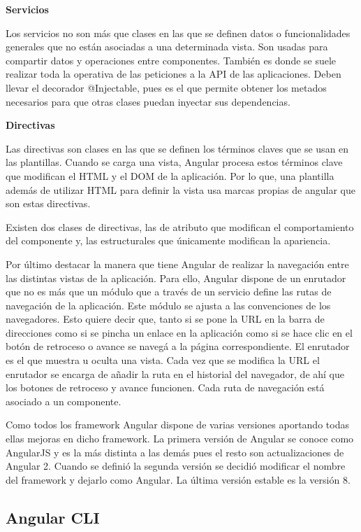 \documentclass[a4paper, 12pt]{book}
\begin{document}
\textbf{Servicios}

Los servicios no son más que clases en las que se definen datos o funcionalidades generales que no están asociadas a una determinada vista. Son usadas para compartir datos y operaciones entre componentes. También es donde se suele realizar toda la operativa de las peticiones a la API de las aplicaciones. Deben llevar el decorador @Injectable, pues es el que permite obtener los metados necesarios para que otras clases puedan inyectar sus dependencias. 

\textbf{Directivas}

Las directivas son clases en las que se definen los términos claves que se usan en las plantillas. Cuando se carga una vista, Angular procesa estos términos clave que modifican el HTML y el DOM de la aplicación. Por lo que, una plantilla además de utilizar HTML para definir la vista usa marcas propias de angular que son estas directivas. 

Existen dos clases de directivas, las de atributo que modifican el comportamiento del componente y, las estructurales que únicamente modifican la apariencia. 

Por último destacar la manera que tiene Angular de realizar la navegación entre las distintas vistas de la aplicación. Para ello, Angular dispone de un enrutador que no es más que un módulo que a través de un servicio define las rutas de navegación de la aplicación. Este módulo se ajusta a las convenciones de los navegadores. Esto quiere decir que, tanto si se pone la URL en la barra de direcciones como si se pincha un enlace en la aplicación como si se hace clic en el botón de retroceso o avance se navegá a la página correspondiente. El enrutador es el que muestra u oculta una vista. Cada vez que se modifica la URL el enrutador se encarga de añadir la ruta en el historial del navegador, de ahí que los botones de retroceso y avance funcionen. Cada ruta de navegación está asociado a un componente. 

Como todos los framework Angular dispone de varias versiones aportando todas ellas mejoras en dicho framework. La primera versión de Angular se conoce como AngularJS y es la más distinta a las demás pues el resto son actualizaciones de Angular 2. Cuando se definió la segunda versión se decidió modificar el nombre del framework y dejarlo como Angular. La última versión estable es la versión 8.

\subsection{Angular CLI} 
\label{sec:Angular CLI}
\end{document}
